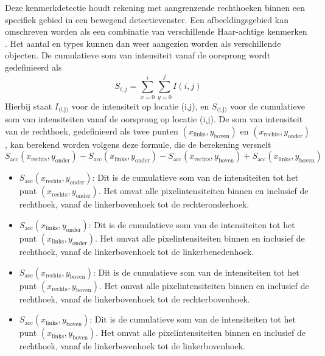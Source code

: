 Deze kenmerkdetectie houdt rekening met aangrenzende rechthoeken binnen een specifiek gebied in een bewegend detectievenster. Een afbeeldingsgebied kan omschreven worden als een combinatie van verschillende Haar-achtige kenmerken \autocite{Jibo2013}. Het aantal en types kunnen dan weer aangezien worden als verschillende objecten. De cumulatieve som van intensiteit vanaf de oorsprong wordt gedefinieerd als \begin{equation*}S_{i,j} = \sum_{x=0}^{i} \sum_{y=0}^{j} I(i, j)\end{equation*} Hierbij staat \( I_\text{(i,j)} \) voor de intensiteit op locatie (i,j), en \( S_\text{(i,j)} \) voor de cumulatieve som van intensiteiten vanaf de oorsprong op locatie (i,j). De som van intensiteit van de rechthoek, gedefinieerd als twee punten \( (x_{\text{links}}, y_{\text{boven}}) \) en  \( (x_{\text{rechts}}, y_{\text{onder}}) \), kan berekend worden volgens deze formule, die de berekening versnelt \begin{equation*}
    S_{\text{acc}}(x_{\text{rechts}}, y_{\text{onder}}) - S_{\text{acc}}(x_{\text{links}}, y_{\text{onder}}) - S_{\text{acc}}(x_{\text{rechts}}, y_{\text{boven}}) + S_{\text{acc}}(x_{\text{links}}, y_{\text{boven}})
\end{equation*}
\begin{itemize}
    \item \( S_{\text{acc}}(x_{\text{rechts}}, y_{\text{onder}}) \): Dit is de cumulatieve som van de intensiteiten tot het punt \( (x_{\text{rechts}}, y_{\text{onder}}) \). Het omvat alle pixelintensiteiten binnen en inclusief de rechthoek, vanaf de linkerbovenhoek tot de rechteronderhoek.
    \item \( S_{\text{acc}}(x_{\text{links}}, y_{\text{onder}}) \): Dit is de cumulatieve som van de intensiteiten tot het punt \( (x_{\text{links}}, y_{\text{onder}}) \). Het omvat alle pixelintensiteiten binnen en inclusief de rechthoek, vanaf de linkerbovenhoek tot de linkerbenedenhoek.
    \item \( S_{\text{acc}}(x_{\text{rechts}}, y_{\text{boven}}) \): Dit is de cumulatieve som van de intensiteiten tot het punt \( (x_{\text{rechts}}, y_{\text{boven}}) \). Het omvat alle pixelintensiteiten binnen en inclusief de rechthoek, vanaf de linkerbovenhoek tot de rechterbovenhoek.
    \item \( S_{\text{acc}}(x_{\text{links}}, y_{\text{boven}}) \): Dit is de cumulatieve som van de intensiteiten tot het punt \( (x_{\text{links}}, y_{\text{boven}}) \). Het omvat alle pixelintensiteiten binnen en inclusief de rechthoek, vanaf de linkerbovenhoek tot de linkerbovenhoek.
\end{itemize}


